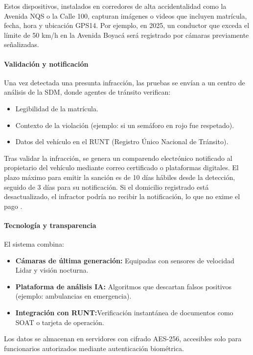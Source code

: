 Estos dispositivos, instalados en corredores de alta accidentalidad como la Avenida NQS o la Calle 100, capturan imágenes o videos que incluyen matrícula, fecha, hora y ubicación GPS14. Por ejemplo, en 2025, un conductor que exceda el límite de 50 km/h en la Avenida Boyacá será registrado por cámaras previamente señalizadas. 

\paragraph{Validación y notificación}
Una vez detectada una presunta infracción, las pruebas se envían a un centro de análisis de la SDM, donde agentes de tránsito verifican:

\begin{itemize}
    \item Legibilidad de la matrícula. 
    \item Contexto de la violación (ejemplo: si un semáforo en rojo fue respetado).
    \item Datos del vehículo en el RUNT (Registro Único Nacional de Tránsito).
\end{itemize}

Tras validar la infracción, se genera un comparendo electrónico notificado al propietario del vehículo mediante correo certificado o plataformas digitales. El plazo máximo para emitir la sanción es de 10 días hábiles desde la detección, seguido de 3 días para su notificación. Si el domicilio registrado está desactualizado, el infractor podría no recibir la notificación, lo que no exime el pago \parencite{ley1843}. 

\paragraph{Tecnología y transparencia}
El sistema combina: 
\begin{itemize}
    \item \textbf{Cámaras de última generación: }Equipadas con sensores de velocidad Lidar y visión nocturna. 
    \item \textbf{Plataforma de análisis IA: }Algoritmos que descartan falsos positivos (ejemplo: ambulancias en emergencia). 
        \item \textbf{Integración con RUNT:}Verificación instantánea de documentos como SOAT o tarjeta de operación.
\end{itemize}

Los datos se almacenan en servidores con cifrado AES-256, accesibles solo para funcionarios autorizados mediante autenticación biométrica.

